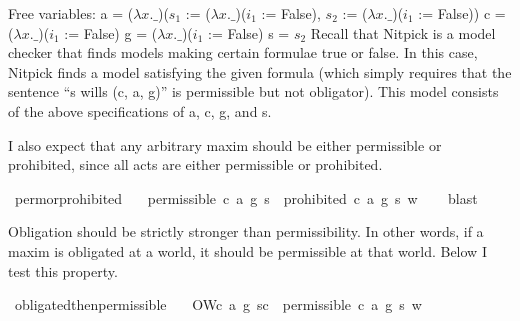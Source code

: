 \begin{isabellebody}
{  Free variables:
    a = ($\lambda x. \_$)($s_1$ := ($\lambda x. \_$)($i_1$ := False), $s_2$ := ($\lambda x. \_$)($i_1$ := False))
    c = ($\lambda x. \_$)($i_1$ := False)
    g = ($\lambda x. \_$)($i_1$ := False)
    s = $s_2$\color{black}
Recall that Nitpick is a model checker that finds models making certain formulae true or false. In this 
case, Nitpick finds a model satisfying the given formula (which simply requires that the sentence 
``s wills (c, a, g)'' is permissible but not obligator). This model consists of the above specifications 
of a, c, g, and s.%
}%
\endisatagproof
{\isafoldproof}%
%
\isadelimproof
%
\endisadelimproof
%
\begin{isamarkuptext}%
I also expect that any arbitrary maxim should be either permissible or prohibited, since all 
acts are either permissible or prohibited.%
\end{isamarkuptext}\isamarkuptrue%
\isamarkupfalse%
\ perm{\isacharunderscore}or{\isacharunderscore}prohibited{\isacharcolon}\isanewline
\ \ \ {\isachardoublequoteopen}{\isacharparenleft}{\isacharparenleft}permissible\ {\isacharparenleft}c{\isacharcomma}\ a{\isacharcomma}\ g{\isacharparenright}\ s{\isacharparenright}\ \isactrlbold {\isasymor}\ {\isacharparenleft}prohibited\ {\isacharparenleft}c{\isacharcomma}\ a{\isacharcomma}\ g{\isacharparenright}\ s{\isacharparenright}{\isacharparenright}\ w{\isachardoublequoteclose}\isanewline
%
\isadelimproof
\ \ %
\endisadelimproof
%
\isatagproof
{}\isamarkupfalse%
\ blast\isanewline
%
%
\endisatagproof
{\isafoldproof}%
%
\isadelimproof
%
\endisadelimproof
%
\begin{isamarkuptext}%
Obligation should be strictly stronger than permissibility. In other words, if a maxim is 
obligated at a world, it should be permissible at that world. Below I test this property.%
\end{isamarkuptext}\isamarkuptrue%
\isamarkupfalse%
\ obligated{\isacharunderscore}then{\isacharunderscore}permissible{\isacharcolon}\isanewline
\ \ \ {\isachardoublequoteopen}{\isacharparenleft}O{\isacharbraceleft}W{\isacharparenleft}c{\isacharcomma}\ a{\isacharcomma}\ g{\isacharparenright}\ s{\isacharbar}c{\isacharbraceright}\ \isactrlbold {\isasymrightarrow}\ {\isacharparenleft}permissible\ {\isacharparenleft}c{\isacharcomma}\ a{\isacharcomma}\ g{\isacharparenright}{\isacharparenright}\ s{\isacharparenright}\ w\ {\isachardoublequoteclose}\isanewline

\end{isabellebody}
